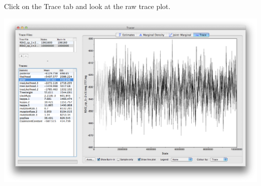 \documentclass[12pt]{article}
\begin{document}

Click on the Trace tab and look at the raw trace plot.

\medskip{}

\includegraphics[width=\textwidth]{figures/Tracer2}
\end{document}
